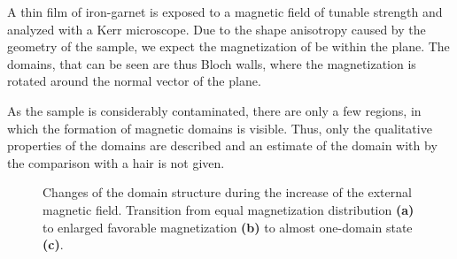 \documentclass[a4paper]{scrartcl}
\numberwithin{equation}{section}
\numberwithin{figure}{section}
\numberwithin{table}{section}
\begin{document}
A thin film of iron-garnet is exposed to a magnetic field of tunable strength and analyzed with a Kerr microscope. Due to the shape anisotropy caused by the geometry of the sample, we expect the magnetization of be within the plane. The domains, that can be seen are thus Bloch walls, where the magnetization is rotated around the normal vector of the plane. 

As the sample is considerably contaminated, there are only a few regions, in which the formation of magnetic domains is visible. Thus, only the qualitative properties of the domains are described and an estimate of the domain with by the comparison with a hair is not given.


\begin{figure} 
 \centering
{} \hfill
{} \hfill
{} \hfill
\caption{ Changes of the domain structure during the increase of the external magnetic field. Transition from equal magnetization distribution \textbf{(a)} to enlarged favorable magnetization \textbf{(b)} to almost one-domain state \textbf{(c)}.
\small  } 
	\label{fig:domains}
\end{figure}
\end{document}
